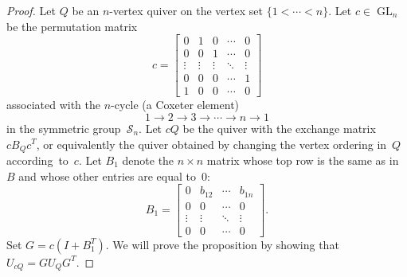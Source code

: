 \documentclass[11pt, letterpaper]{amsart}
\theoremstyle{definition}
\numberwithin{equation}{section}
\def\GL{{\operatorname{GL}}}
\begin{document}
\begin{proof}
Let $Q$ be an $n$-vertex quiver on the vertex set $\{1<\cdots<n\}$.
Let $c\in\GL_n$ be the permutation matrix 
\begin{equation}
\label{eq:cyclic-shift}
c=
\begin{bmatrix}
0 & 1 & 0 & \cdots & 0 \\
0 & 0 & 1 & \cdots & 0 \\
\vdots & \vdots & \vdots & \ddots & \vdots  \\
0 & 0 & 0 & \cdots & 1 \\
1 & 0 & 0 & \cdots & 0
\end{bmatrix}
\end{equation}
associated with the $n$-cycle (a Coxeter element)
\begin{equation}
\label{eq:long-cycle}
1 \rightarrow 2 \rightarrow 3 \rightarrow \cdots \rightarrow n \rightarrow 1
\end{equation}
in the symmetric group~$\mathcal{S}_n$.
Let $cQ$ be the quiver with the exchange matrix~$c B_Q c^T$,
or equivalently the quiver obtained by changing the vertex ordering in~$Q$ according~to~$c$.
Let $B_1$ denote the $n\times n$ matrix whose top row is the same as in $B$ and whose other entries are equal to~$0$: 
\begin{equation*}
B_1 =
\begin{bmatrix}
0 & b_{12} & \cdots & b_{1n} \\
0 & 0 & \cdots & 0 \\
\vdots &  \vdots & \ddots & \vdots  \\
0 & 0 & \cdots & 0 
\end{bmatrix}
.
\end{equation*}
Set %
$G=c (I + B_1^T)$. 
We will prove the proposition by showing that $U_{cQ} = G U_Q G^T$. 


\end{proof}
\end{document}
